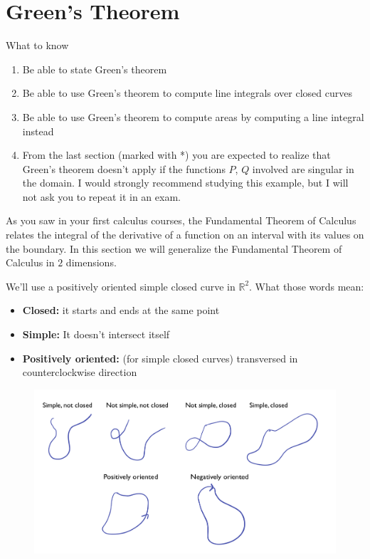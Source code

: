 \documentclass[12pt]{article}
\title{}
\newcommand{\R}{ \mathbb{R}}
\begin{document}
\section*{Green's Theorem	}
What to know
\begin{enumerate}
\item Be able to state Green's theorem
\item Be able to use Green's theorem to compute line integrals over closed curves
\item Be able to use Green's theorem to compute areas by computing a line integral instead
\item From the last section (marked with *) you are expected to realize that Green's theorem doesn't apply if the functions $P$, $Q$ involved are singular in the domain. I would strongly recommend studying this example, but I will not ask you to repeat it in an exam.
\end{enumerate}

As you saw in your first calculus courses, the Fundamental Theorem of Calculus relates the integral of the derivative of a function on an interval with its values on the boundary. In this section we will generalize the Fundamental Theorem of Calculus in $2$ dimensions.

We'll use a positively oriented simple closed curve in $\R^2$. What those words mean:
\begin{itemize}
\item \textbf{Closed:} it starts and ends at the same point
\item \textbf{Simple:} It doesn't intersect itself
\item \textbf{Positively oriented:} (for simple closed curves) transversed in counterclockwise direction
\end{itemize}

\begin{figure}[h]
\begin{center}
\includegraphics[scale=.3]{definitions.jpeg}
\end{center}
\end{figure}
\end{document}
